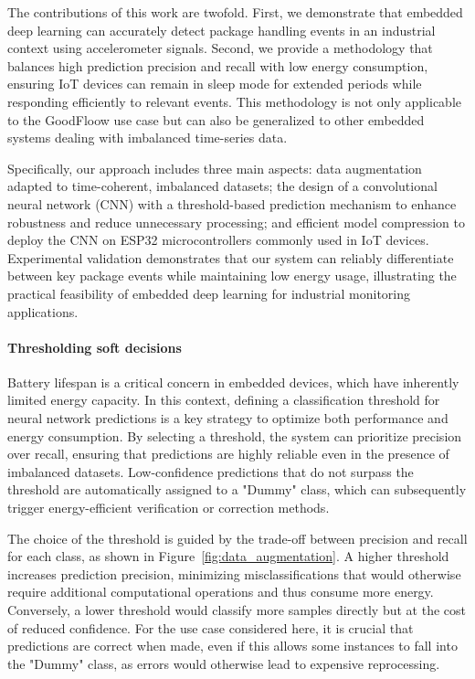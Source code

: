 \documentclass[11pt]{report}
\begin{document}
The contributions of this work are twofold. First, we demonstrate that embedded deep learning can accurately detect package handling events in an industrial context using accelerometer signals. Second, we provide a methodology that balances high prediction precision and recall with low energy consumption, ensuring IoT devices can remain in sleep mode for extended periods while responding efficiently to relevant events. This methodology is not only applicable to the GoodFloow use case but can also be generalized to other embedded systems dealing with imbalanced time-series data.

Specifically, our approach includes three main aspects: data augmentation adapted to time-coherent, imbalanced datasets; the design of a convolutional neural network (CNN) with a threshold-based prediction mechanism to enhance robustness and reduce unnecessary processing; and efficient model compression to deploy the CNN on ESP32 microcontrollers commonly used in IoT devices. Experimental validation demonstrates that our system can reliably differentiate between key package events while maintaining low energy usage, illustrating the practical feasibility of embedded deep learning for industrial monitoring applications.

\paragraph{Thresholding soft decisions}

Battery lifespan is a critical concern in embedded devices, which have inherently limited energy capacity. In this context, defining a classification threshold for neural network predictions is a key strategy to optimize both performance and energy consumption. By selecting a threshold, the system can prioritize precision over recall, ensuring that predictions are highly reliable even in the presence of imbalanced datasets. Low-confidence predictions that do not surpass the threshold are automatically assigned to a "Dummy" class, which can subsequently trigger energy-efficient verification or correction methods.

The choice of the threshold is guided by the trade-off between precision and recall for each class, as shown in Figure~\ref{fig:data_augmentation}. A higher threshold increases prediction precision, minimizing misclassifications that would otherwise require additional computational operations and thus consume more energy. Conversely, a lower threshold would classify more samples directly but at the cost of reduced confidence. For the use case considered here, it is crucial that predictions are correct when made, even if this allows some instances to fall into the "Dummy" class, as errors would otherwise lead to expensive reprocessing.
\end{document}
